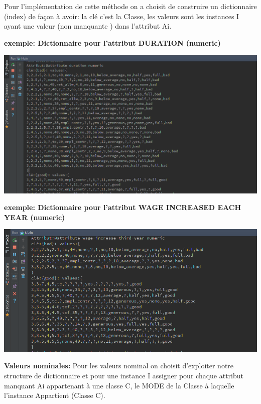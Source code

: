 \documentclass[12pt,a4paper,oneside]{book}
\begin{document}
	Pour l'implémentation de cette méthode on a choisit de construire un dictionnaire (index) de façon à avoir: la clé c'est la Classe, les valeurs sont les instances I ayant une valeur (non manquante ) dans l'attribut Ai.
	
	\textbf{exemple: Dictionnaire pour l'attribut DURATION (numeric)}
	\begin{center}
		\includegraphics[width=1\textwidth]{screens/dic1.png}%
		\label{labelname}%
	\end{center}
	
	\textbf{exemple: Dictionnaire pour l'attribut WAGE INCREASED EACH YEAR (numeric)}
	\begin{center}
		\includegraphics[width=1\textwidth]{screens/dic2.png}%
		\label{labelname}%
	\end{center}
	
	\textbf{Valeurs nominales:}
	Pour les valeurs nominal on choisit d'exploiter notre structure de dictionnaire et pour une instance I assigner pour chaque attribut manquant Ai appartenant à une classe C, le MODE de la Classe à laquelle l'instance Appartient (Classe C).\\
	
\end{document}
